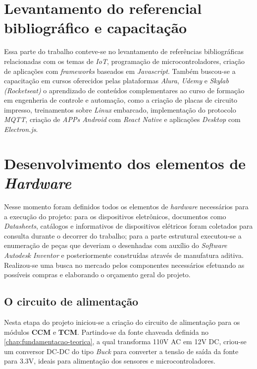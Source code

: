 \section{Levantamento do referencial bibliográfico e capacitação}
\label{sec:metmodal}

Essa parte do trabalho conteve-se no levantamento de referências bibliográficas relacionadas com os temas de \textit{IoT}, programação de microcontroladores, criação de aplicações com \textit{frameworks} baseados em \textit{Javascript}. Também buscou-se a capacitação em cursos oferecidos pelas plataformas \textit{Alura}, \textit{Udemy} e \textit{Skylab (Rocketseat)} o aprendizado de conteúdos complementares ao curso de formação em engenheria de controle e automação, como a criação de placas de circuito impresso, treinamentos sobre \textit{Linux} embarcado, implementação do protocolo \textit{MQTT}, criação de \textit{APPs Android} com \textit{React Native} e aplicações \textit{Desktop} com \textit{Electron.js}.

\section{Desenvolvimento dos elementos de \textit{Hardware}}
\label{sec: dev_ele_hw}

Nesse momento foram definidos todos os elementos de \textit{hardware} necessários para a execução do projeto: para os dispositivos eletrônicos, documentos como \textit{Datasheets}, catálogos e informativos de dispositivos elétricos foram coletados para consulta durante o decorrer do trabalho; para a parte estrutural executou-se a enumeração de peças que deveriam o desenhadas com auxílio do \textit{Software Autodesk Inventor} e posteriormente construídas através de manufatura aditiva.  Realizou-se uma busca no mercado pelos componentes necessários efetuando as possíveis compras e elaborando o orçamento geral do projeto.

\subsection{O circuito de alimentação}

Nesta etapa do projeto iniciou-se a criação do circuito de alimentação para os módulos \textbf{CCM} e \textbf{TCM}. Partindo-se da fonte chaveada definida no \autoref{chap:fundamentacao-teorica}, a qual transforma 110V AC em 12V DC, criou-se um conversor DC-DC do tipo \textit{Buck} para converter a tensão de saída da fonte para 3.3V, ideais para alimentação dos sensores e microcontroladores. 


